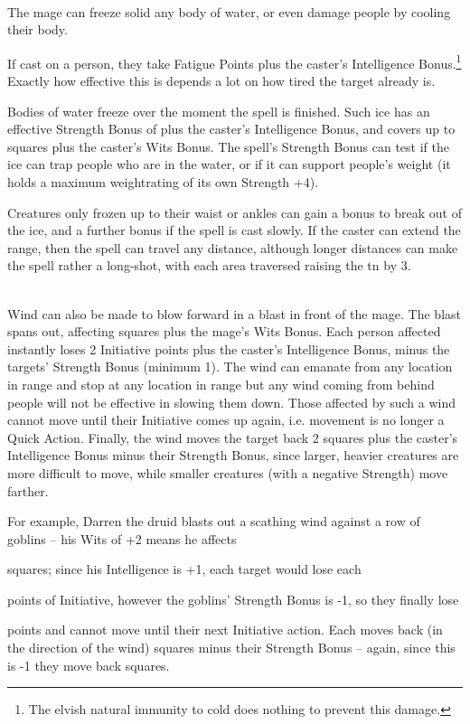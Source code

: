 \begin{multicols}{2}
\\
The mage can freeze solid any body of water, or even damage people by cooling their body.

If cast on a person, they take  Fatigue Points plus the caster's Intelligence Bonus.\footnote{The elvish natural immunity to cold does nothing to prevent this damage.}
Exactly how effective this is depends a lot on how tired the target already is.

Bodies of water freeze over the moment the spell is finished.
Such ice has an effective Strength Bonus of  plus the caster's Intelligence Bonus, and covers up to  squares plus the caster's Wits Bonus.
The spell's Strength Bonus can test if the ice can trap people who are in the water, or if it can support people's weight (it holds a maximum \gls{weightrating} of its own Strength +4).

Creatures only frozen up to their waist or ankles can gain a bonus to break out of the ice, and a further bonus if the spell is cast slowly.
If the caster can extend the range, then the spell can travel any distance, although longer distances can make the spell rather a long-shot, with each area traversed raising the \gls{tn} by 3.

\\
Wind can also be made to blow forward in a blast in front of the mage.
The blast spans out, affecting  squares plus the mage's Wits Bonus.
Each person affected instantly loses 2 Initiative points plus the caster's Intelligence Bonus, minus the targets' Strength Bonus (minimum 1).
The wind can emanate from any location in range and stop at any location in range but any wind coming from behind people will not be effective in slowing them down.
Those affected by such a wind cannot move until their Initiative comes up again, i.e. movement is no longer a Quick Action.
Finally, the wind moves the target back 2 squares plus the caster's Intelligence Bonus minus their Strength Bonus, since larger, heavier creatures are more difficult to move, while smaller creatures (with a negative Strength) move farther.

For example, Darren the druid blasts out a scathing wind against a row of goblins -- his Wits of +2 means he affects \setcounter{list}{2}\addtocounter{list}{\value{spelllevel}} squares; since his Intelligence is +1, each target would lose each \setcounter{enc}{1}\addtocounter{enc}{\value{spelllevel}} points of Initiative, however the goblins' Strength Bonus is -1, so they finally lose \addtocounter{enc}{1} points and cannot move until their next Initiative action.
Each moves back (in the direction of the wind)  squares minus their Strength Bonus -- again, since this is -1 they move back  squares.


\end{multicols}

